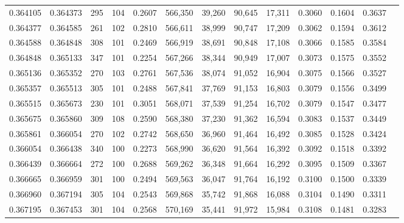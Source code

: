\begin{tabular}{rrrrrrrrrrrrr}
0.364105 & 0.364373 &   295 & 104 &                                     0.2607 & 566,350 &  39,260 &  90,645 &  17,311 & 0.3060 & 0.1604 & 0.3637 \\
0.364377 & 0.364585 &   261 & 102 &                                     0.2810 & 566,611 &  38,999 &  90,747 &  17,209 & 0.3062 & 0.1594 & 0.3612 \\
0.364588 & 0.364848 &   308 & 101 &                                     0.2469 & 566,919 &  38,691 &  90,848 &  17,108 & 0.3066 & 0.1585 & 0.3584 \\
0.364848 & 0.365133 &   347 & 101 &                                     0.2254 & 567,266 &  38,344 &  90,949 &  17,007 & 0.3073 & 0.1575 & 0.3552 \\
0.365136 & 0.365352 &   270 & 103 &                                     0.2761 & 567,536 &  38,074 &  91,052 &  16,904 & 0.3075 & 0.1566 & 0.3527 \\
0.365357 & 0.365513 &   305 & 101 &                                     0.2488 & 567,841 &  37,769 &  91,153 &  16,803 & 0.3079 & 0.1556 & 0.3499 \\
0.365515 & 0.365673 &   230 & 101 &                                     0.3051 & 568,071 &  37,539 &  91,254 &  16,702 & 0.3079 & 0.1547 & 0.3477 \\
0.365675 & 0.365860 &   309 & 108 &                                     0.2590 & 568,380 &  37,230 &  91,362 &  16,594 & 0.3083 & 0.1537 & 0.3449 \\
0.365861 & 0.366054 &   270 & 102 &                                     0.2742 & 568,650 &  36,960 &  91,464 &  16,492 & 0.3085 & 0.1528 & 0.3424 \\
0.366054 & 0.366438 &   340 & 100 &                                     0.2273 & 568,990 &  36,620 &  91,564 &  16,392 & 0.3092 & 0.1518 & 0.3392 \\
0.366439 & 0.366664 &   272 & 100 &                                     0.2688 & 569,262 &  36,348 &  91,664 &  16,292 & 0.3095 & 0.1509 & 0.3367 \\
0.366665 & 0.366959 &   301 & 100 &                                     0.2494 & 569,563 &  36,047 &  91,764 &  16,192 & 0.3100 & 0.1500 & 0.3339 \\
0.366960 & 0.367194 &   305 & 104 &                                     0.2543 & 569,868 &  35,742 &  91,868 &  16,088 & 0.3104 & 0.1490 & 0.3311 \\
0.367195 & 0.367453 &   301 & 104 &                                     0.2568 & 570,169 &  35,441 &  91,972 &  15,984 & 0.3108 & 0.1481 & 0.3283 \\

\end{tabular}
